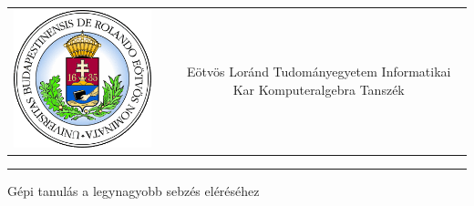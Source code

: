 \documentclass[12pt]{article}
\begin{document}
	
	

\begin{titlepage}
	\vspace*{0cm}
	\centering
	\begin{tabular}{cp{1cm}c}
		\begin{minipage}{4cm}
			\vspace{0pt}
			\includegraphics[width=1\textwidth]{elte_cimer}
		\end{minipage} & &
		\begin{minipage}{7cm}
			\vspace{0pt}Eötvös Loránd Tudományegyetem \vspace{10pt} \newline
			Informatikai Kar \vspace{10pt} \newline
			Komputeralgebra Tanszék
		\end{minipage}
	\end{tabular}
	
	\vspace*{0.2cm}
	\rule{\textwidth}{1pt}
	
	\vspace*{4cm}
	{\Huge Gépi tanulás a legynagyobb sebzés eléréséhez }
	
	\vspace*{9cm}
	

\end{titlepage}
\end{document}
